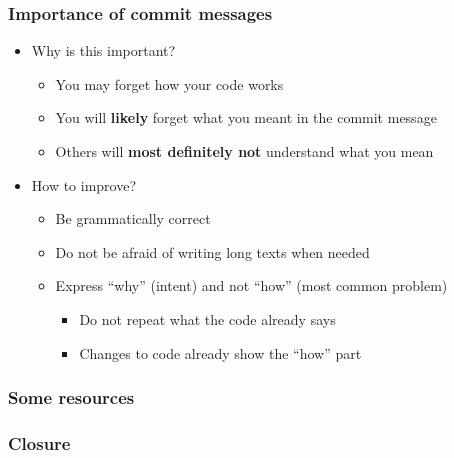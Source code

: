 \documentclass{beamer}
\begin{document}
\begin{frame}
  \frametitle{Importance of commit messages}
  \begin{itemize}
  \item<1-> Why is this important?
    \begin{itemize}
    \item<2-> You may forget how your code works
    \item<3-> You will \textbf{likely} forget what you meant in the commit message
    \item<4-> Others will \textbf{most definitely not} understand what you mean 
    \end{itemize}
  \item<5-> How to improve?
    \begin{itemize}
    \item<6-> Be grammatically correct
    \item<7-> Do not be afraid of writing long texts when needed
    \item<8-> Express ``why'' (intent) and not ``how'' (most common problem)
      \begin{itemize}
      \item <8-> Do not repeat what the code already says
      \item <8-> Changes to code already show the ``how'' part
      \end{itemize}
    \end{itemize}
  \end{itemize}
\end{frame}

\begin{frame}
  \frametitle{Some resources}
\end{frame}

\begin{frame}
  \frametitle{Closure}
\end{frame}
\end{document}

